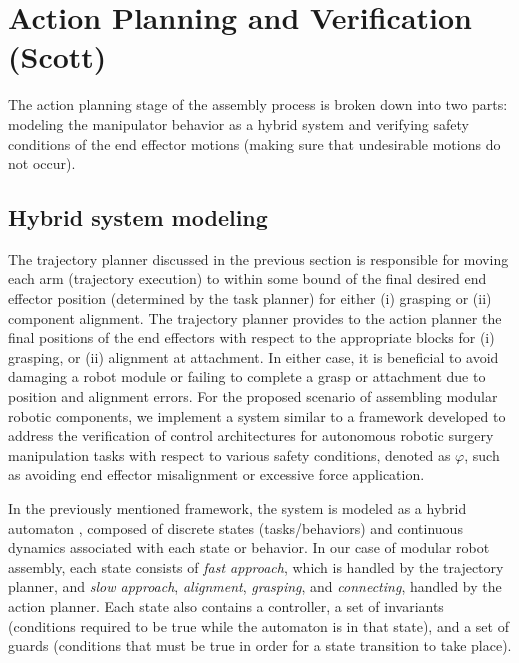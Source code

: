 \section{Action Planning and Verification (Scott)}

The action planning stage of the assembly process is broken down into two parts: modeling the manipulator behavior as a hybrid system and verifying safety conditions of the end effector motions (making sure that undesirable motions do not occur).

\subsection{Hybrid system modeling}
The trajectory planner discussed in the previous section is responsible for moving each arm (trajectory execution) to within some bound of the final desired end effector position (determined by the task planner) for either (i) grasping or (ii) component alignment. 
The trajectory planner provides to the action planner the final positions of the end effectors with respect to the appropriate blocks for (i) grasping, or (ii) alignment at attachment.
In either case, it is beneficial to avoid damaging a robot module or failing to complete a grasp or attachment due to position and alignment errors.
For the proposed scenario of assembling modular robotic components, we implement a system similar to a framework \cite{6016596} developed to address the verification of control architectures for autonomous robotic surgery manipulation tasks with respect to various safety conditions, denoted as $\varphi$, such as avoiding end effector misalignment or excessive force application.

In the previously mentioned framework, the system is modeled as a hybrid automaton \cite{Alur1993}, composed of discrete states (tasks/behaviors) and continuous dynamics associated with each state or behavior.
In our case of modular robot assembly, each state consists of \textit{fast approach}, which is handled by the trajectory planner, and \textit{slow approach}, \textit{alignment}, \textit{grasping}, and \textit{connecting}, handled by the action planner. 
Each state also contains a controller, a set of invariants (conditions required to be true while the automaton is in that state), and a set of guards (conditions that must be true in order for a state transition to take place).

